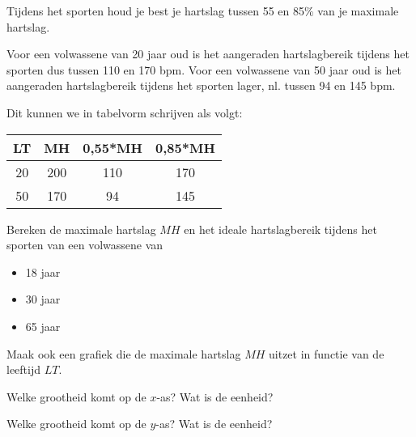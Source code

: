 Tijdens het sporten houd je best je hartslag tussen 55 en 85\% van je maximale hartslag. 

Voor een volwassene van 20 jaar oud is het aangeraden hartslagbereik tijdens het sporten dus tussen 110 en 170 bpm.
Voor een volwassene van 50 jaar oud is het aangeraden hartslagbereik tijdens het sporten lager, nl. tussen 94 en 145 bpm.

Dit kunnen we in tabelvorm schrijven als volgt:

\begin{center}	
	\begin{tabular}{c|ccc}
		LT & MH & 0,55*MH & 0,85*MH \\
		\hline
		20 & 200 & 110 & 170 \\
		50 & 170 & 94 & 145 
	\end{tabular}
\end{center}

\begin{oef}
Bereken de maximale hartslag $MH$ en het ideale hartslagbereik tijdens het sporten van een volwassene van 
\begin{itemize}
	\item 18 jaar
	\item 30 jaar
	\item 65 jaar
\end{itemize}
\end{oef}

\begin{oef}Maak ook een grafiek die de maximale hartslag $MH$ uitzet in functie van de leeftijd $LT$. 

Welke grootheid komt op de $x$-as? Wat is de eenheid? 

Welke grootheid komt op de $y$-as? Wat is de eenheid?
\end{oef}

